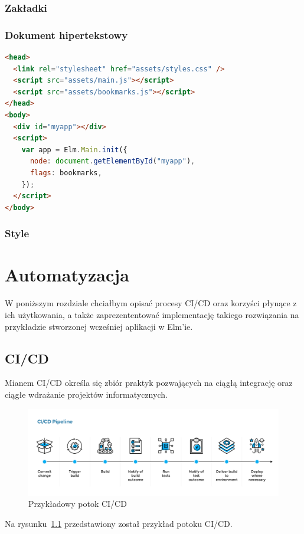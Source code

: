 \documentclass[twoside,a4paper]{report}
\begin{document}
\subsection{Zakładki}

\subsection{Dokument hipertekstowy}
\begin{lstlisting}[caption={Zawartość pliku \texttt{index.html}},label={lst:index.html},language=html]
<head>
  <link rel="stylesheet" href="assets/styles.css" />
  <script src="assets/main.js"></script>
  <script src="assets/bookmarks.js"></script>
</head>
<body>
  <div id="myapp"></div>
  <script>
    var app = Elm.Main.init({
      node: document.getElementById("myapp"),
      flags: bookmarks,
    });
  </script>
</body>
\end{lstlisting}

\subsection{Style}


\chapter{Automatyzacja}
W poniższym rozdziale chciałbym opisać procesy CI/CD oraz korzyści płynące z ich użytkowania, a także zaprezententować implementację takiego rozwiązania na przykładzie stworzonej wcześniej aplikacji w Elm'ie.

\section{CI/CD}
Mianem CI/CD określa się zbiór praktyk pozwających na ciągłą integrację oraz ciągłe wdrażanie projektów informatycznych.
\begin{figure}[H]
    \centering
    \includegraphics[width=1\textwidth]{cicd_pipeline.png}
    \caption{Przykładowy potok CI/CD}\label{fig:cicd_pipeline}
\end{figure}
Na rysunku~\ref{fig:cicd_pipeline} przedstawiony został przykład potoku CI/CD\@.
\end{document}
